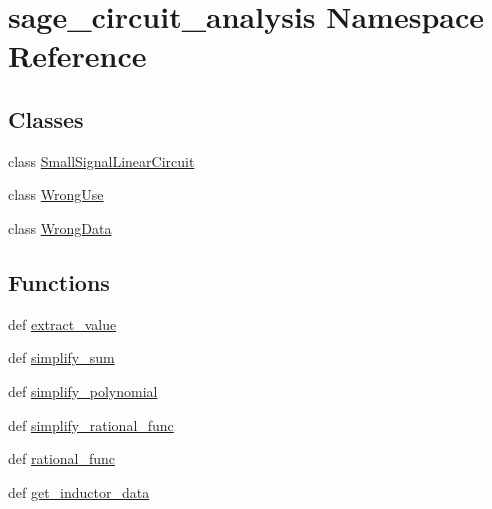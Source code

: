 \hypertarget{namespacesage__circuit__analysis}{\section{sage\-\_\-circuit\-\_\-analysis Namespace Reference}
\label{namespacesage__circuit__analysis}
}
\subsection*{Classes}
\begin{DoxyCompactItemize}
\item 
class \hyperlink{classsage__circuit__analysis_1_1SmallSignalLinearCircuit}{Small\-Signal\-Linear\-Circuit}
\item 
class \hyperlink{classsage__circuit__analysis_1_1WrongUse}{Wrong\-Use}
\item 
class \hyperlink{classsage__circuit__analysis_1_1WrongData}{Wrong\-Data}
\end{DoxyCompactItemize}
\subsection*{Functions}
\begin{DoxyCompactItemize}
\item 
def \hyperlink{namespacesage__circuit__analysis_a20195c1f38102dfb151149f38f95648b}{extract\-\_\-value}
\item 
def \hyperlink{namespacesage__circuit__analysis_a03dd269825ac5c1abc6cf08aa7f095ca}{simplify\-\_\-sum}
\item 
def \hyperlink{namespacesage__circuit__analysis_aaeda7087f11c5bbd3f8c8fe40b70385c}{simplify\-\_\-polynomial}
\item 
def \hyperlink{namespacesage__circuit__analysis_a30e35c0ddc7b77121dc41a95d07d356a}{simplify\-\_\-rational\-\_\-func}
\item 
def \hyperlink{namespacesage__circuit__analysis_aafa3a82cff9a4b87e42b8118d66e7497}{rational\-\_\-func}
\item 
def \hyperlink{namespacesage__circuit__analysis_a862d105ff2299e184caaa8dcd558b687}{get\-\_\-inductor\-\_\-data}
\end{DoxyCompactItemize}
